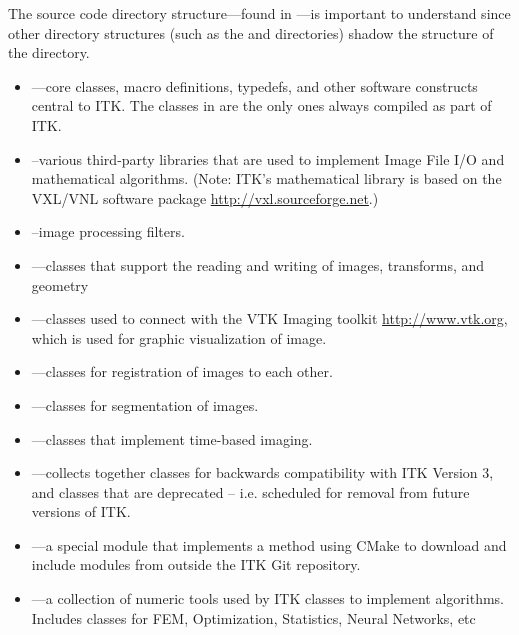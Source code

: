 The source code directory structure---found in ---is
important to understand since other directory structures (such as the
 and  directories) shadow the structure of the
 directory.
\begin{itemize}
        \item {}---core classes, macro definitions,
        typedefs, and other software constructs central to ITK. The classes
        in  are the only ones always compiled as part of ITK.
        \item {}--various third-party libraries
        that are used to implement Image File I/O and mathematical algorithms.
        (Note: ITK's mathematical library is based
        on the VXL/VNL software package \url{http://vxl.sourceforge.net}.)
        \item {}--image processing
        filters.
        \item {}---classes that support the reading
        and writing of images, transforms, and geometry
        \item {}---classes used to connect with the
        VTK Imaging toolkit \url{http://www.vtk.org}, which is used for
        graphic visualization of image.
        \item {}---classes for registration of
        images to each other.
        \item {}---classes for segmentation of
        images.
        \item {}---classes that implement time-based
        imaging.
        \item {}---collects together classes
        for backwards compatibility with ITK Version 3, and classes that are
        deprecated -- i.e. scheduled for removal from future versions of ITK.
        \item {}---a special module that implements a
        method using CMake to download and include modules from outside the
        ITK Git repository.
        \item {}---a collection of numeric tools used
        by ITK classes to implement algorithms. Includes classes for FEM,
        Optimization, Statistics, Neural Networks, etc
\end{itemize}


